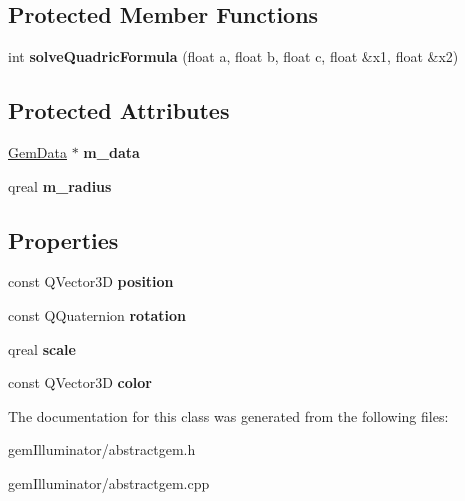 \subsection*{Protected Member Functions}
\begin{DoxyCompactItemize}
\item 
\hypertarget{class_abstract_gem_a85e872137d38a2c4a9a38f1f0b996bdc}{}int {\bfseries solve\+Quadric\+Formula} (float a, float b, float c, float \&x1, float \&x2)\label{class_abstract_gem_a85e872137d38a2c4a9a38f1f0b996bdc}

\end{DoxyCompactItemize}
\subsection*{Protected Attributes}
\begin{DoxyCompactItemize}
\item 
\hypertarget{class_abstract_gem_a10a337f732ade69f1988659852f837c6}{}\hyperlink{class_gem_data}{Gem\+Data} $\ast$ {\bfseries m\+\_\+data}\label{class_abstract_gem_a10a337f732ade69f1988659852f837c6}

\item 
\hypertarget{class_abstract_gem_ab058af121fa66616cab7551e9418048a}{}qreal {\bfseries m\+\_\+radius}\label{class_abstract_gem_ab058af121fa66616cab7551e9418048a}

\end{DoxyCompactItemize}
\subsection*{Properties}
\begin{DoxyCompactItemize}
\item 
\hypertarget{class_abstract_gem_accd665898ada9bc95c886bfbcf56d9a8}{}const Q\+Vector3\+D {\bfseries position}\label{class_abstract_gem_accd665898ada9bc95c886bfbcf56d9a8}

\item 
\hypertarget{class_abstract_gem_a6d85928549d64d369864716dbe2c716b}{}const Q\+Quaternion {\bfseries rotation}\label{class_abstract_gem_a6d85928549d64d369864716dbe2c716b}

\item 
\hypertarget{class_abstract_gem_a71c3b2720a5e3da61741f9043427ab51}{}qreal {\bfseries scale}\label{class_abstract_gem_a71c3b2720a5e3da61741f9043427ab51}

\item 
\hypertarget{class_abstract_gem_ae73e6ac2448549460fbc597354ab0854}{}const Q\+Vector3\+D {\bfseries color}\label{class_abstract_gem_ae73e6ac2448549460fbc597354ab0854}

\end{DoxyCompactItemize}


The documentation for this class was generated from the following files\+:\begin{DoxyCompactItemize}
\item 
gem\+Illuminator/abstractgem.\+h\item 
gem\+Illuminator/abstractgem.\+cpp\end{DoxyCompactItemize}
